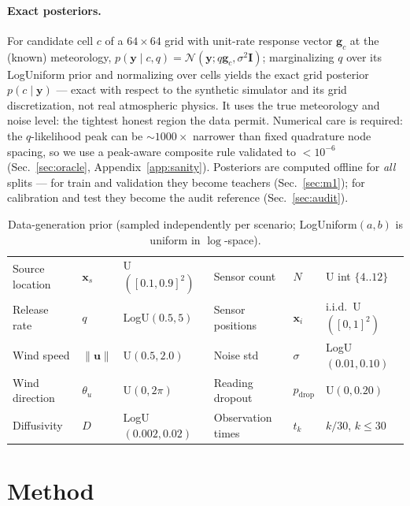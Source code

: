 \documentclass{article}
\begin{document}
\paragraph{Exact posteriors.} For candidate cell $c$ of a $64 \times 64$ grid with
unit-rate response vector $\boldsymbol{g}_c$ at the (known) meteorology,
$p(\boldsymbol{y} \mid c, q) = \mathcal{N}(\boldsymbol{y}; q\boldsymbol{g}_c, \sigma^2\mathbf{I})$; marginalizing
$q$ over its LogUniform prior and normalizing over cells yields the exact grid posterior
$p(c \mid \boldsymbol{y})$ --- exact with respect to the synthetic simulator and its grid
discretization, not real atmospheric physics. It uses the true meteorology and noise
level: the tightest honest region the data permit. Numerical care is required: the
$q$-likelihood peak can be $\sim\!1000\times$ narrower than fixed quadrature node spacing,
so we use a peak-aware composite rule validated to $<10^{-6}$
(Sec.~\ref{sec:oracle}, Appendix~\ref{app:sanity}). Posteriors are computed offline for
\emph{all} splits --- for train and validation they become teachers
(Sec.~\ref{sec:m1}); for calibration and test they become the audit
reference (Sec.~\ref{sec:audit}).

\begin{table}[t]
  \caption{Data-generation prior (sampled independently per scenario;
  LogUniform$(a,b)$ is uniform in $\log$-space).}
  \label{tab:prior}
  \centering
  \small
  \begin{tabular}{lll@{\qquad}lll}
    \toprule
    Source location & $\boldsymbol{x}_s$ & U$([0.1, 0.9]^2)$ &
    Sensor count & $N$ & U int $\{4..12\}$ \\
    Release rate & $q$ & LogU$(0.5, 5)$ &
    Sensor positions & $\boldsymbol{x}_i$ & i.i.d.\ U$([0, 1]^2)$ \\
    Wind speed & $\lVert\boldsymbol{u}\rVert$ & U$(0.5, 2.0)$ &
    Noise std & $\sigma$ & LogU$(0.01, 0.10)$ \\
    Wind direction & $\theta_u$ & U$(0, 2\pi)$ &
    Reading dropout & $p_{\mathrm{drop}}$ & U$(0, 0.20)$ \\
    Diffusivity & $D$ & LogU$(0.002, 0.02)$ &
    Observation times & $t_k$ & $k/30$, $k \leq 30$ \\
    \bottomrule
  \end{tabular}
\end{table}

\section{Method}
\end{document}
